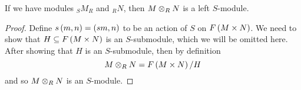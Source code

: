 \medskip

\begin{pro}
    If we have modules $_SM_R$ and $_RN$, then $M\otimes_R N$ is a left $S$-module.
\end{pro}
\begin{proof}
    Define $s \left(m,n\right) = \left(sm,n\right)$ to be an action of $S$ on $F \left(M\times N\right)$. We need to show that $H\subseteq F \left(M\times N\right)$ is an $S$-submodule, which we will be omitted here. After showing that $H$ is an $S$-submodule, then by definition
    \[M \otimes _R N = F \left(M\times N\right)/H\]
    and so $M\otimes_R N$ is an $S$-module.
\end{proof}

\medskip
